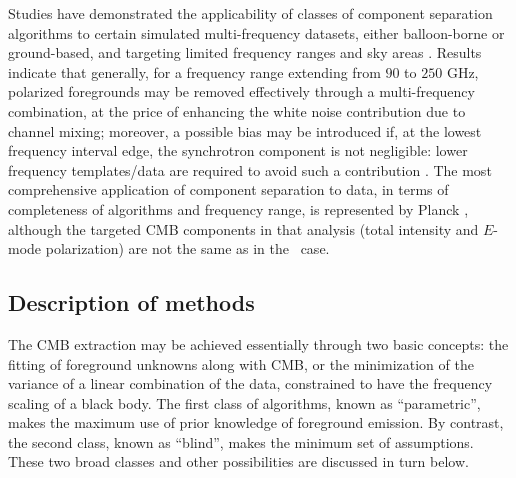 Studies have demonstrated the applicability of classes of component separation 
algorithms to certain simulated multi-frequency datasets, either balloon-borne or ground-based, and targeting limited frequency ranges and sky areas \cite{stivoli10,fantaye11,fantaye12}. Results indicate that generally, for a frequency range extending from $90$ to $250$ GHz, polarized foregrounds may be removed effectively through a multi-frequency combination, at the price of enhancing the white noise contribution due to channel mixing; moreover, a possible bias may be introduced if, at the lowest frequency interval edge, the synchrotron component is not negligible: lower frequency templates/data are required to avoid such a contribution \cite{essinger14}. 
The most comprehensive application of component separation to data, in terms of completeness of algorithms and frequency range, is represented by Planck \cite{planck15-9}, 
although the targeted CMB components in that analysis (total intensity and $E$-mode polarization) are
not the same as in the \cmbexp\ case.

\subsection{Description of methods}

The CMB extraction may be achieved essentially through two basic concepts: the fitting of foreground unknowns along with CMB, or the minimization of the variance of a linear combination of the data, constrained to have the frequency scaling of a black body.
The first class of algorithms, known as ``parametric'', makes the maximum use of prior knowledge of foreground emission. By contrast, the second class, known as ``blind'', makes the minimum set of assumptions. 
These two broad classes and other possibilities are discussed in turn below.

